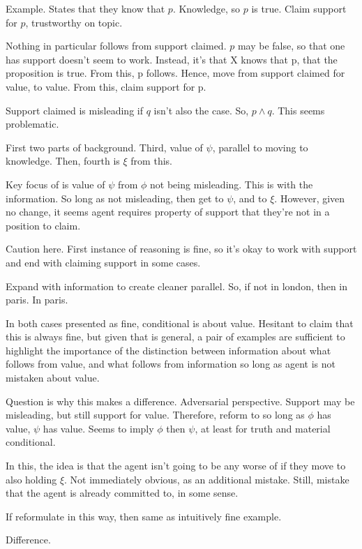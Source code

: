 \begin{note}
  Example.
  States that they know that \(p\).
  Knowledge, so \(p\) is true.
  Claim support for \(p\), trustworthy on topic.

  Nothing in particular follows from support claimed.
  \(p\) may be false, so that one has support doesn't seem to work.
  Instead, it's that X knows that p, that the proposition is true.
  From this, p follows.
  Hence, move from support claimed for value, to value.
  From this, claim support for p.

  Support claimed is misleading if \(q\) isn't also the case.
  So, \(p \land q\).
  This seems problematic.

  First two parts of \nI{} background.
  Third, value of \(\psi\), parallel to moving to knowledge.
  Then, fourth is \(\xi\) from this.

  Key focus of \nI{} is value of \(\psi\) from \(\phi\) not being misleading.
  This is with the information.
  So long as not misleading, then get to \(\psi\), and to \(\xi\).
  However, given no change, it seems agent requires property of support that they're not in a position to claim.

  Caution here.
  First instance of reasoning is fine, so it's okay to work with support and end with claiming support in some cases.

  Expand with information to create cleaner parallel.
  So, if not in london, then in paris.
  In paris.

  In both cases presented as fine, conditional is about value.
  Hesitant to claim that this is always fine, but given that \nI{} is general, a pair of examples are sufficient to highlight the importance of the distinction between information about what follows from value, and what follows from information so long as agent is not mistaken about value.

  Question is why this makes a difference.
  Adversarial perspective.
  Support may be misleading, but still support for value.
  Therefore, reform to so long as \(\phi\) has value, \(\psi\) has value.
  Seems to imply \(\phi\) then \(\psi\), at least for truth and material conditional.

  In this, the idea is that the agent isn't going to be any worse of if they move to also holding \(\xi\).
  Not immediately obvious, as an additional mistake.
  Still, mistake that the agent is already committed to, in some sense.

  If reformulate in this way, then same as intuitively fine example.

  Difference.


\end{note}
